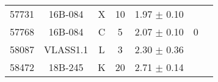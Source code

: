 \begin{table}
\begin{tabular}{lcccccr}
    57731     & 16B-084 & X     & 10    & 1.97  $\pm$ 0.10  &  &\\

    57768     & 16B-084 & C     & 5     & 2.07  $\pm$ 0.10  & 0 &\\
    58087     & VLASS1.1 & L     & 3     & 2.30  $\pm$ 0.36  & & \\
    
    58472     & 18B-245 & K     & 20    & 2.71  $\pm$ 0.14  &  & \\



\hline 
\end{tabular}   
\end{table}




     